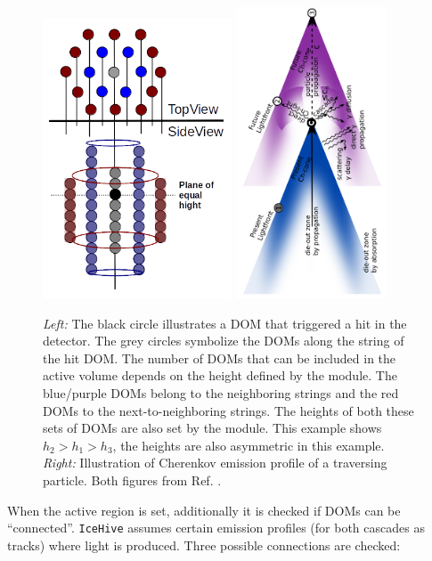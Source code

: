 \begin{figure}[t]
\centering
\includegraphics[width=0.5\textwidth]{chapter7/img/hexagons.png}
\includegraphics[width=0.4\textwidth]{chapter7/img/cherenkovzoll.png}
\caption{\textit{Left: }The black circle illustrates a DOM that triggered a hit in the detector. The grey circles symbolize the DOMs along the string of the hit DOM. The number of DOMs that can be included in the active volume depends on the height defined by the module. The blue/purple DOMs belong to the neighboring strings and the red DOMs to the next-to-neighboring strings. The heights of both these sets of DOMs are also set by the module. This example shows $h_2 > h_1 > h_3$, the heights are also asymmetric in this example. \textit{Right: }Illustration of Cherenkov emission profile of a traversing particle. Both figures from Ref. \cite{mzollthesis}.}
\label{fig:hexagon}
\end{figure}
When the active region is set, additionally it is checked if DOMs can be ``connected''. \texttt{IceHive} assumes certain emission profiles (for both cascades as tracks) where light is produced. Three possible connections are checked:

